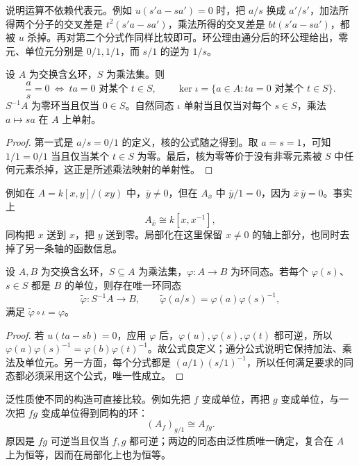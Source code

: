 说明运算不依赖代表元。例如 \(u(s'a-sa')=0\) 时，把 \(a/s\) 换成 \(a'/s'\)，加法所得两个分子的交叉差是 \(t^2(s'a-sa')\)，乘法所得的交叉差是 \(bt(s'a-sa')\)，都被 \(u\) 杀掉。再对第二个分式作同样比较即可。环公理由通分后的环公理给出，零元、单位元分别是 \(0/1,1/1\)，而 \(s/1\) 的逆为 \(1/s\)。

\begin{proposition}\label{g5:prop:localization-zero}
	设 \(A\) 为交换含幺环，\(S\) 为乘法集。则
	\[
	\frac as=0\ \Longleftrightarrow\
	ta=0\text{ 对某个 }t\in S,\qquad
	\ker\iota=\{a\in A:ta=0\text{ 对某个 }t\in S\}.
	\]
	\(S^{-1}A\) 为零环当且仅当 \(0\in S\)。自然同态 \(\iota\) 单射当且仅当对每个 \(s\in S\)，乘法 \(a\mapsto sa\) 在 \(A\) 上单射。
\end{proposition}
\begin{proof}
	第一式是 \(a/s=0/1\) 的定义，核的公式随之得到。取 \(a=s=1\)，可知 \(1/1=0/1\) 当且仅当某个 \(t\in S\) 为零。最后，核为零等价于没有非零元素被 \(S\) 中任何元素杀掉，这正是所述乘法映射的单射性。
\end{proof}

例如在 \(A=k[x,y]/(xy)\) 中，\(\overline y\ne0\)，但在 \(A_{\overline x}\) 中 \(\overline y/1=0\)，因为 \(\overline x\,\overline y=0\)。事实上
\[
	A_{\overline x}\cong k[x,x^{-1}],
\]
同构把 \(x\) 送到 \(x\)，把 \(y\) 送到零。局部化在这里保留 \(x\ne0\) 的轴上部分，也同时去掉了另一条轴的函数信息。

\begin{theorem}[局部化的泛性质]\label{g5:thm:localization-universal}
	设 \(A,B\) 为交换含幺环，\(S\subseteq A\) 为乘法集，\(\varphi:A\to B\) 为环同态。若每个 \(\varphi(s)\)、\(s\in S\) 都是 \(B\) 的单位，则存在唯一环同态
	\[
	\widetilde\varphi:S^{-1}A\longrightarrow B,\qquad
	\widetilde\varphi(a/s)=\varphi(a)\varphi(s)^{-1},
	\]
	满足 \(\widetilde\varphi\circ\iota=\varphi\)。
\end{theorem}
\begin{proof}
	若 \(u(ta-sb)=0\)，应用 \(\varphi\) 后，\(\varphi(u),\varphi(s),\varphi(t)\) 都可逆，所以 \(\varphi(a)\varphi(s)^{-1}=\varphi(b)\varphi(t)^{-1}\)。故公式良定义；通分公式说明它保持加法、乘法及单位元。另一方面，每个分式都是 \((a/1)(s/1)^{-1}\)，所以任何满足要求的同态都必须采用这个公式，唯一性成立。
\end{proof}

泛性质使不同的构造可直接比较。例如先把 \(f\) 变成单位，再把 \(g\) 变成单位，与一次把 \(fg\) 变成单位得到同构的环：
\[
	(A_f)_{g/1}\cong A_{fg}.
\]
原因是 \(fg\) 可逆当且仅当 \(f,g\) 都可逆；两边的同态由泛性质唯一确定，复合在 \(A\) 上为恒等，因而在局部化上也为恒等。


